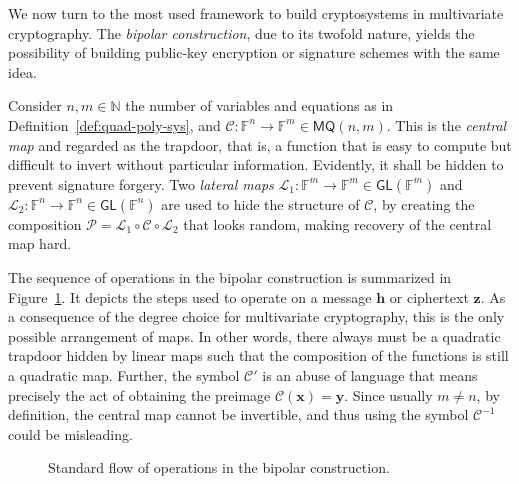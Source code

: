 \documentclass[english]{ufsc-thesis-rn46-2019/ufsc-thesis-rn46-2019}
\theoremstyle{definition}
\begin{document}
We now turn to the most used framework to build cryptosystems in multivariate
cryptography. The \emph{bipolar construction}, due to its twofold nature,
yields the possibility of building public-key encryption or signature schemes
with the same idea.

Consider $n, m \in \mathbb{N}$ the number of variables and equations as in
Definition~\ref{def:quad-poly-sys}, and
$\mathcal{C} : \mathbb{F}^{n} \to \mathbb{F}^{m} \in \mathsf{MQ}(n, m)$. This
is the \emph{central map} and regarded as the trapdoor, that is, a function
that is easy to compute but difficult to invert without particular
information. Evidently, it shall be hidden to prevent signature forgery. Two
\emph{lateral maps}
$\mathcal{L}_{1} :
  \mathbb{F}^{m} \to \mathbb{F}^{m} \in \mathsf{GL}(\mathbb{F}^{m})$ and
$\mathcal{L}_{2} :
  \mathbb{F}^{n} \to \mathbb{F}^{n} \in \mathsf{GL}(\mathbb{F}^{n})$ are used
to hide the structure of $\mathcal{C}$, by creating the composition
$\mathcal{P} = \mathcal{L}_{1} \circ \mathcal{C} \circ \mathcal{L}_{2}$ that
looks random, making recovery of the central map hard.

The sequence of operations in the bipolar construction is summarized in
Figure~\ref{fig:bipolar}. It depicts the steps used to operate on a message
$\mathbf{h}$ or ciphertext $\mathbf{z}$. As a consequence of the degree choice
for multivariate cryptography, this is the only possible arrangement of
maps. In other words, there always must be a quadratic trapdoor hidden by
linear maps such that the composition of the functions is still a quadratic
map. Further, the symbol $\mathcal{C}'$ is an abuse of language that means
precisely the act of obtaining the preimage
$\mathcal{C}(\mathbf{x}) = \mathbf{y}$. Since usually $m \neq n$, by
definition, the central map cannot be invertible, and thus using the symbol
$\mathcal{C}^{-1}$ could be misleading.

\begin{figure}[htbp]
  \centering
  \caption{Standard flow of operations in the bipolar
    construction.}\label{fig:bipolar}
\end{figure}
\end{document}
